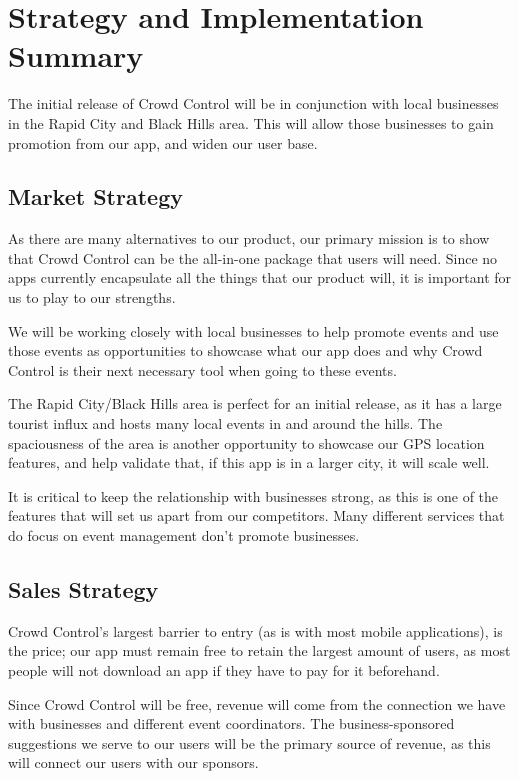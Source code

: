 

\chapter{Strategy and Implementation Summary}

The initial release of Crowd Control will be in conjunction with local businesses in the Rapid City and Black Hills area. This will allow those businesses to gain promotion from our app, and widen our user base.

\section{Market Strategy}
As there are many alternatives to our product, our primary mission is to show that Crowd Control can be the all-in-one package that users will need. Since no apps currently encapsulate all the things that our product will, it is important for us to play to our strengths.

We will be working closely with local businesses to help promote events and use those events as opportunities to showcase what our app does and why Crowd Control is their next necessary tool when going to these events.

The Rapid City/Black Hills area is perfect for an initial release, as it has a large tourist influx and hosts many local events in and around the hills. The spaciousness of the area is another opportunity to showcase our GPS location features, and help validate that, if this app is in a larger city, it will scale well.

It is critical to keep the relationship with businesses strong, as this is one of the features that will set us apart from our competitors. Many different services that do focus on event management don’t promote businesses.

\section{Sales Strategy}

Crowd Control’s largest barrier to entry (as is with most mobile applications), is the price; our app must remain free to retain the largest amount of users, as most people will not download an app if they have to pay for it beforehand.

Since Crowd Control will be free, revenue will come from the connection we have with businesses and different event coordinators. The business-sponsored suggestions we serve to our users will be the primary source of revenue, as this will connect our users with our sponsors.


